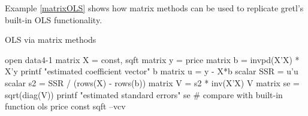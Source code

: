 Example \ref{matrixOLS} shows how matrix methods can be used to
replicate gretl's built-in OLS functionality.

\begin{script}[htbp]
  \caption{OLS via matrix methods}
  \label{matrixOLS}
\begin{scode}
open data4-1
matrix X = { const, sqft }
matrix y = { price }
matrix b = invpd(X'X) * X'y
printf "estimated coefficient vector\n"
b
matrix u = y - X*b
scalar SSR = u'u
scalar s2 = SSR / (rows(X) - rows(b))
matrix V = s2 * inv(X'X)
V
matrix se = sqrt(diag(V))
printf "estimated standard errors\n"
se
# compare with built-in function
ols price const sqft --vcv
\end{scode}
\end{script}

